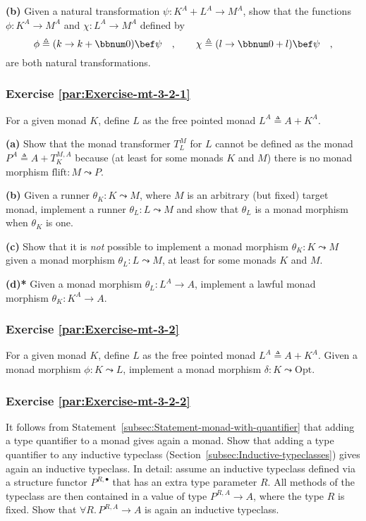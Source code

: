 \textbf{(b)} Given a natural transformation $\psi:K^{A}+L^{A}\rightarrow M^{A}$,
show that the functions $\phi:K^{A}\rightarrow M^{A}$ and $\chi:L^{A}\rightarrow M^{A}$
defined by
\[
\phi\triangleq(k\rightarrow k+\bbnum 0)\bef\psi\quad,\quad\quad\chi\triangleq(l\rightarrow\bbnum 0+l)\bef\psi\quad,
\]
are both natural transformations.

\subsubsection{Exercise \label{par:Exercise-mt-3-2-1}\ref{par:Exercise-mt-3-2-1}}

For a given monad $K$, define $L$ as the free pointed monad $L^{A}\triangleq A+K^{A}$. 

\textbf{(a)} Show that the monad transformer $T_{L}^{M}$ for $L$
cannot be defined as the monad $P^{A}\triangleq A+T_{K}^{M,A}$ because
(at least for some monads $K$ and $M$) there is no monad morphism
$\text{flift}:M\leadsto P$.

\textbf{(b)} Given a runner $\theta_{K}:K\leadsto M$, where $M$
is an arbitrary (but fixed) target monad, implement a runner $\theta_{L}:L\leadsto M$
and show that $\theta_{L}$ is a monad morphism when $\theta_{K}$
is one.

\textbf{(c)} Show that it is \emph{not} possible to implement a monad
morphism $\theta_{K}:K\leadsto M$ given a monad morphism $\theta_{L}:L\leadsto M$,
at least for some monads $K$ and $M$.

\textbf{(d){*}} Given a monad morphism $\theta_{L}:L^{A}\rightarrow A$,
implement a lawful monad morphism $\theta_{K}:K^{A}\rightarrow A$. 

\subsubsection{Exercise \label{par:Exercise-mt-3-2}\ref{par:Exercise-mt-3-2}}

For a given monad $K$, define $L$ as the free pointed monad $L^{A}\triangleq A+K^{A}$.
Given a monad morphism $\phi:K\leadsto L$, implement a monad morphism
$\delta:K\leadsto\text{Opt}$.

\subsubsection{Exercise \label{par:Exercise-mt-3-2-2}\ref{par:Exercise-mt-3-2-2}}

It follows from Statement~\ref{subsec:Statement-monad-with-quantifier}
that adding a type quantifier to a monad gives again a monad. Show
that adding a type quantifier to any inductive typeclass (Section~\ref{subsec:Inductive-typeclasses})
gives again an inductive typeclass. In detail: assume an inductive
typeclass defined via a structure functor $P^{R,\bullet}$ that has
an extra type parameter $R$. All methods of the typeclass are then
contained in a value of type $P^{R,A}\rightarrow A$, where the type
$R$ is fixed. Show that $\forall R.\,P^{R,A}\rightarrow A$ is again
an inductive typeclass.

